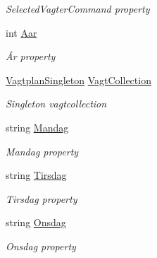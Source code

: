 \begin{DoxyCompactItemize}
\begin{DoxyCompactList}\small\item\em Selected\+Vagter\+Command property \end{DoxyCompactList}\item 
int \hyperlink{class__1aarsproeve_1_1_view_model_1_1_vagtplan_view_model_a228aec3a762361d7f727ef3deacac91c}{Aar}
\begin{DoxyCompactList}\small\item\em År property \end{DoxyCompactList}\item 
\hyperlink{class__1aarsproeve_1_1_model_1_1_vagtplan_singleton}{Vagtplan\+Singleton} \hyperlink{class__1aarsproeve_1_1_view_model_1_1_vagtplan_view_model_ae7053bf4cbd85b49e181e72586909c20}{Vagt\+Collection}
\begin{DoxyCompactList}\small\item\em Singleton vagtcollection \end{DoxyCompactList}\item 
string \hyperlink{class__1aarsproeve_1_1_view_model_1_1_vagtplan_view_model_aa78a723e55f22d0579a6a5cc0086a2fc}{Mandag}
\begin{DoxyCompactList}\small\item\em Mandag property \end{DoxyCompactList}\item 
string \hyperlink{class__1aarsproeve_1_1_view_model_1_1_vagtplan_view_model_a504d0377b323ec2af99d27a0b586924a}{Tirsdag}
\begin{DoxyCompactList}\small\item\em Tirsdag property \end{DoxyCompactList}\item 
string \hyperlink{class__1aarsproeve_1_1_view_model_1_1_vagtplan_view_model_a4d544dfd8109650066d5e9d25642c352}{Onsdag}
\begin{DoxyCompactList}\small\item\em Onsdag property \end{DoxyCompactList}\item 

\end{DoxyCompactItemize}
